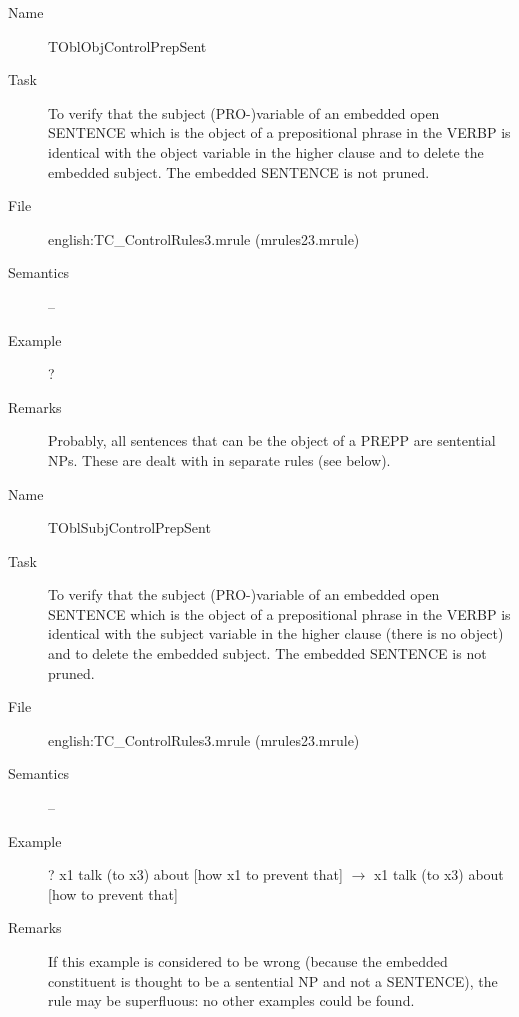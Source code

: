 \begin{description}
\vspace{1 cm}
\begin{description}
\item[Name]   TOblObjControlPrepSent
\item[Task] To verify that  the subject (PRO-)variable of an embedded 
open SENTENCE which is the object of a prepositional phrase in the VERBP is 
identical with the object variable in the higher clause 
and to delete the embedded subject. The embedded SENTENCE is not pruned.
\item[File] english:TC\_ControlRules3.mrule (mrules23.mrule)
\item[Semantics] --
\item[Example] ? 
\item[Remarks] Probably, all sentences that can be the object of a PREPP are 
sentential NPs. These are dealt with in separate rules (see below).
\end{description}

\vspace{1 cm}
\begin{description}
\item[Name] TOblSubjControlPrepSent
\item[Task] To verify that  the subject (PRO-)variable of an embedded 
open SENTENCE which is the object of a prepositional phrase in the VERBP is 
identical with the subject variable in the higher clause (there is no object)
and to delete the embedded subject. The embedded SENTENCE is not pruned.
\item[File] english:TC\_ControlRules3.mrule (mrules23.mrule)
\item[Semantics] --
\item[Example] ? x1 talk (to x3) about [how x1 to prevent that] $\rightarrow$ x1 
talk (to x3) about [how to prevent that]
\item[Remarks] If this example is considered to be wrong (because the 
embedded constituent is thought to be a sentential NP and not a SENTENCE), the 
rule may be superfluous: no other examples could be found.
\end{description}


\end{description}

